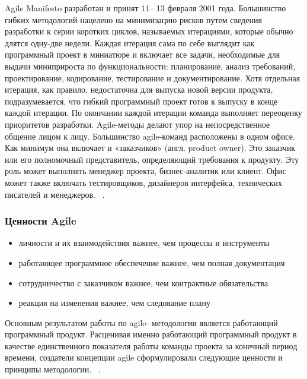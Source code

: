 \documentclass{../industrial-development}
\begin{document}
\lecturenotes
Agile Manifesto разработан и принят 11– 13 февраля 2001 года.
Большинство гибких методологий нацелено на минимизацию рисков путем сведения разработки к серии коротких циклов, называемых итерациями, которые обычно длятся одну-две недели. Каждая итерация сама по себе выглядит как программный проект в миниатюре и включает все задачи, необходимые для выдачи миниприроста по функциональности: планирование, анализ требований, проектирование, кодирование, тестирование и документирование. Хотя отдельная итерация, как правило, недостаточна для выпуска новой версии продукта, подразумевается, что гибкий программный проект готов к выпуску в конце каждой итерации. По окончании каждой итерации команда выполняет переоценку приоритетов разработки. 
Agile-методы делают упор на непосредственное общение лицом к лицу. Большинство agile-команд расположены в одном офисе. Как минимум она включает и «заказчиков» (англ. product owner). Это заказчик или его полномочный представитель, определяющий требования к продукту. Эту роль может выполнять менеджер проекта, бизнес-аналитик или клиент. Офис может также включать тестировщиков, дизайнеров интерфейса, технических писателей и менеджеров. 
~\cite{Fowler}.


\begin{frame} \frametitle{Ценности Agile}
	\begin{itemize}
	\item личности и их взаимодействия важнее, чем процессы и инструменты 
	\item работающее программное обеспечение важнее, чем полная документация 
	\item сотрудничество с заказчиком важнее, чем контрактные обязательства 
	\item реакция на изменения важнее, чем следование плану 
	\end{itemize}
\end{frame}

\lecturenotes
Основным результатом работы по agile- методологии является работающий программный продукт. Расценивая именно работающий программный продукт в качестве единственного показателя работы команды проекта за конечный период времени, создатели концепции agile сформулировали следующие ценности и принципы методологии. 
~\cite{Fowler}.
\end{document}
